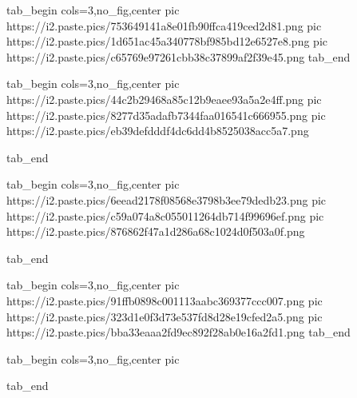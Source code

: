  
 
 
 
 
\zzSecCmtScr

\ifcmt
  tab_begin cols=3,no_fig,center
	     pic https://i2.paste.pics/753649141a8e01fb90ffca419ced2d81.png
	     pic https://i2.paste.pics/1d651ac45a340778bf985bd12e6527e8.png
	     pic https://i2.paste.pics/c65769e97261cbb38c37899af2f39e45.png
  tab_end
\fi

\ifcmt
  tab_begin cols=3,no_fig,center
		pic https://i2.paste.pics/44c2b29468a85c12b9eaee93a5a2e4ff.png
		pic https://i2.paste.pics/8277d35adafb7344faa016541c666955.png
		pic https://i2.paste.pics/eb39defdddf4dc6dd4b8525038acc5a7.png

  tab_end
\fi

\ifcmt
  tab_begin cols=3,no_fig,center
		pic https://i2.paste.pics/6eead2178f08568e3798b3ee79dedb23.png
		pic https://i2.paste.pics/c59a074a8c055011264db714f99696ef.png
		pic https://i2.paste.pics/876862f47a1d286a68c1024d0f503a0f.png

  tab_end
\fi

\ifcmt
  tab_begin cols=3,no_fig,center
		pic https://i2.paste.pics/91ffb0898c001113aabc369377ccc007.png
		pic https://i2.paste.pics/323d1e0f3d73e537fd8d28e19cfed2a5.png
		pic https://i2.paste.pics/bba33eaaa2fd9ec892f28ab0e16a2fd1.png
  tab_end
\fi

\ifcmt
  tab_begin cols=3,no_fig,center
	pic 

  tab_end
\fi
